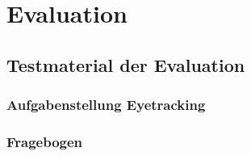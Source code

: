\documentclass[Bachelorarbeit.tex]{subfiles}
\begin{document}
\chapter{Evaluation}
\label{anhangEvaluation}

\section{Testmaterial der Evaluation}
\label{anhangTestmaterial}

\newpage
\subsection{Aufgabenstellung Eyetracking}
\label{anhangEyetracking}



\newpage
\subsection{Fragebogen}
\label{anhangFragebogen}


\end{document}
